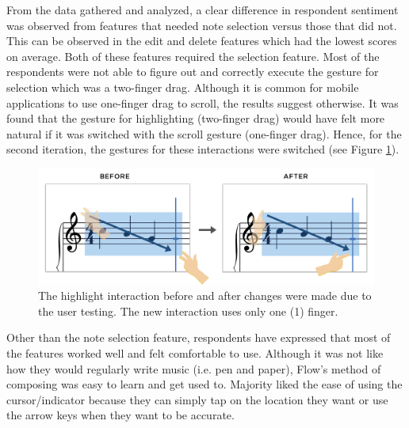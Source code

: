 			From the data gathered and analyzed, a clear difference in respondent sentiment was observed from features that needed note selection versus those that did not. This can be observed in the edit and delete features which had the lowest scores on average. Both of these features required the selection feature. Most of the respondents were not able to figure out and correctly execute the gesture for selection which was a two-finger drag. Although it is common for mobile applications to use one-finger drag to scroll, the results suggest otherwise. It was found that the gesture for highlighting (two-finger drag) would have felt more natural if it was switched with the scroll gesture (one-finger drag). Hence, for the second iteration, the gestures for these interactions were switched (see Figure \ref{fig:highlight}).

			\begin{figure}[h]
				\centering
				\includegraphics[scale=0.25]{figures/before-after-highlight.png}
			    \caption{The highlight interaction before and after changes were made due to the user testing. The new interaction uses only one (1) finger.}
			    \label{fig:highlight}
			\end{figure}

			Other than the note selection feature, respondents have expressed that most of the features worked well and felt comfortable to use. Although it was not like how they would regularly write music (i.e. pen and paper), Flow's method of composing was easy to learn and get used to. Majority liked the ease of using the cursor/indicator because they can simply tap on the location they want or use the arrow keys when they want to be accurate.

